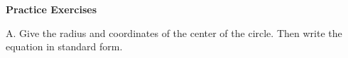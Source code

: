 \def\curdir{/storage/emulated/0/Documents/documents/latex/1920/Grade-10/2nd/equation-and-graph-of-a-circle/fa}

\textbf{Practice Exercises}

\vspce

A. Give the radius and coordinates of the center of the circle. Then write the equation in standard form. 
\begin{enumerate}[label = \arabic*. ]

\begin{multicols}{3}
\item 
\item 
\item 
\item 
\item 
\item 
\end{multicols} 
\end{enumerate}  
\vspace*{1ex}
